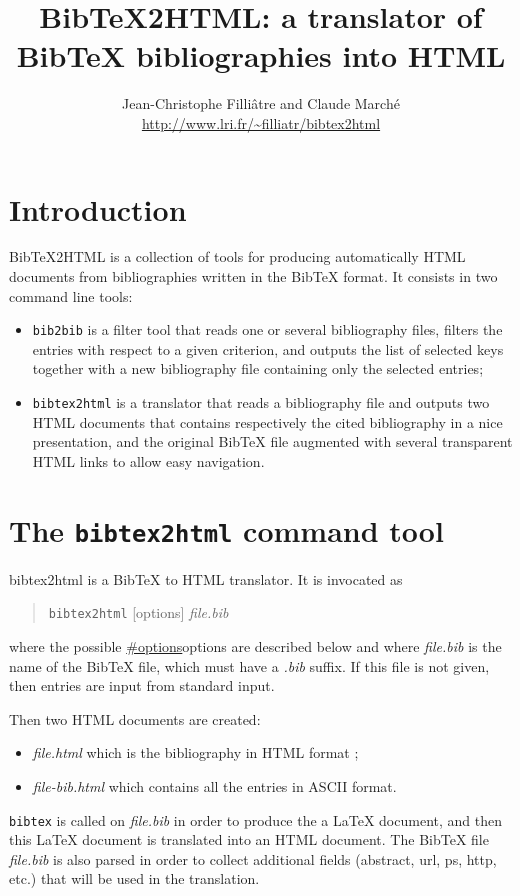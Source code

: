\documentclass[11pt,a4paper]{article}
\newcommand{\monurl}[2]{\url{#1}}
\begin{document}
\title{BibTeX2HTML: a translator of BibTeX bibliographies into HTML}
\author{Jean-Christophe Filli\^{a}tre and Claude March\'e \\
        \normalsize\monurl{http://www.lri.fr/~filliatr/bibtex2html}{http://www.lri.fr/\~{}filliatr/bibtex2html}}
\date{}
\maketitle

\tableofcontents


\section{Introduction}

BibTeX2HTML is a collection of tools for producing automatically HTML
documents from bibliographies written in the BibTeX format. It
consists in two command line tools:
\begin{itemize}
\item \texttt{bib2bib} is a filter tool that reads one or several
  bibliography files, filters the entries with respect to a given
  criterion, and outputs the list of selected keys together with a new
  bibliography file containing only the selected entries;
\item \texttt{bibtex2html} is a translator that reads a bibliography
  file and outputs two HTML documents that contains respectively the
  cited bibliography in a nice presentation, and the original BibTeX
  file augmented with several transparent HTML links to allow easy
  navigation. 
\end{itemize}

\section{The \texttt{bibtex2html} command tool}

bibtex2html is a BibTeX to HTML translator. It is invocated as 
\begin{quote}
\texttt{bibtex2html} [options] \textit{file.bib}
\end{quote}
where the possible \url{#options}{options} are described below and
where \textit{file.bib} is the name of the BibTeX file, which must
have a \textit{.bib} suffix. If this file is not given, then entries
are input from standard input.


Then two HTML documents are created: 
\begin{itemize}
\item \textit{file.html} which is the bibliography in HTML format
;
\item \textit{file-bib.html} which contains all the entries in ASCII
  format.
\end{itemize}
\texttt{bibtex} is called on \textit{file.bib} in order to produce the
a LaTeX document, and then this LaTeX document is translated into an
HTML document.  The BibTeX file \textit{file.bib} is also parsed in
order to collect additional fields (abstract, url, ps, http, etc.)
that will be used in the translation.
\end{document}
